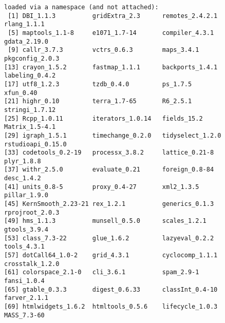 \documentclass{article}\usepackage[]{graphicx}\usepackage[]{xcolor}
\makeatletter
\newenvironment{kframe}{%
 \def\at@end@of@kframe{}%
 \ifinner\ifhmode%
  \def\at@end@of@kframe{\end{minipage}}%
  \begin{minipage}{\columnwidth}%
 \fi\fi%
 \def\FrameCommand##1{\hskip\@totalleftmargin \hskip-\fboxsep
 \colorbox{shadecolor}{##1}\hskip-\fboxsep
     \hskip-\linewidth \hskip-\@totalleftmargin \hskip\columnwidth}%
 \MakeFramed {\advance\hsize-\width
   \@totalleftmargin\z@ \linewidth\hsize
   \@setminipage}}%
 {\par\unskip\endMakeFramed%
 \at@end@of@kframe}
\newenvironment{knitrout}{}{} %
\makeatother
\begin{document}
\begin{knitrout}
\begin{kframe}
\begin{verbatim}
loaded via a namespace (and not attached):
 [1] DBI_1.1.3          gridExtra_2.3      remotes_2.4.2.1    rlang_1.1.1       
 [5] maptools_1.1-8     e1071_1.7-14       compiler_4.3.1     gdata_2.19.0      
 [9] callr_3.7.3        vctrs_0.6.3        maps_3.4.1         pkgconfig_2.0.3   
[13] crayon_1.5.2       fastmap_1.1.1      backports_1.4.1    labeling_0.4.2    
[17] utf8_1.2.3         tzdb_0.4.0         ps_1.7.5           xfun_0.40         
[21] highr_0.10         terra_1.7-65       R6_2.5.1           stringi_1.7.12    
[25] Rcpp_1.0.11        iterators_1.0.14   fields_15.2        Matrix_1.5-4.1    
[29] igraph_1.5.1       timechange_0.2.0   tidyselect_1.2.0   rstudioapi_0.15.0 
[33] codetools_0.2-19   processx_3.8.2     lattice_0.21-8     plyr_1.8.8        
[37] withr_2.5.0        evaluate_0.21      foreign_0.8-84     desc_1.4.2        
[41] units_0.8-5        proxy_0.4-27       xml2_1.3.5         pillar_1.9.0      
[45] KernSmooth_2.23-21 rex_1.2.1          generics_0.1.3     rprojroot_2.0.3   
[49] hms_1.1.3          munsell_0.5.0      scales_1.2.1       gtools_3.9.4      
[53] class_7.3-22       glue_1.6.2         lazyeval_0.2.2     tools_4.3.1       
[57] dotCall64_1.0-2    grid_4.3.1         cyclocomp_1.1.1    crosstalk_1.2.0   
[61] colorspace_2.1-0   cli_3.6.1          spam_2.9-1         fansi_1.0.4       
[65] gtable_0.3.3       digest_0.6.33      classInt_0.4-10    farver_2.1.1      
[69] htmlwidgets_1.6.2  htmltools_0.5.6    lifecycle_1.0.3    MASS_7.3-60       
\end{verbatim}
\end{kframe}
\end{knitrout}


\printbibliography[heading=bibintoc]
\end{document}
